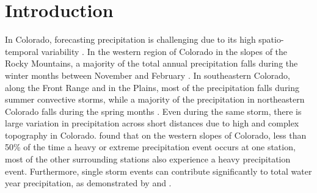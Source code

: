 \documentclass[draft]{agujournal2019}
\begin{document}
\section{Introduction}
\label{intro}

In Colorado, forecasting precipitation is challenging due to its high spatio-temporal variability \cite{Serreze2001CharacteristicsData, Cowie1986ColoradoAnalysis, Kirk2018LargeBasin, Lute2014RoleStates}. In the western region of Colorado in the slopes of the Rocky Mountains, a majority of the total annual precipitation falls during the winter months between November and February \cite{Doesken1984Period., Harvey2019CitizensFrom}. In southeastern Colorado, along the Front Range and in the Plains, most of the precipitation falls during summer convective storms, while a majority of the precipitation in northeastern Colorado falls during the spring months \cite{Doesken1984Period., Harvey2019CitizensFrom}. Even during the same storm, there is large variation in precipitation across short distances due to high and complex topography in Colorado.  found that on the western slopes of Colorado, less than 50\% of the time a heavy or extreme precipitation event occurs at one station, most of the other surrounding stations also experience a heavy precipitation event. Furthermore, single storm events can contribute significantly to total water year precipitation, as demonstrated by  and .

\end{document}
